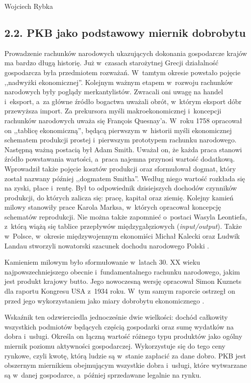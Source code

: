 \begin{artplenv}{Wojciech Rybka}
\subsection{2.2. PKB jako podstawowy miernik dobrobytu}
Prowadzenie rachunków narodowych ukazujących dokonania gospodarcze krajów ma bardzo długą historię. Już w~czasach
starożytnej Grecji działalność gospodarcza była przedmiotem rozważań. W~tamtym okresie powstało pojęcie ,,nadwyżki
ekonomicznej''. Kolejnym ważnym etapem w~rozwoju rachunków narodowych były poglądy merkantylistów. Zwracali oni uwagę na
handel i~eksport, a~za główne źródło bogactwa uważali obrót, w~którym eksport dóbr przewyższa import. Za prekursora
myśli makroekonomicznej i~koncepcji rachunków narodowych uważa się François Quesnay'a. W~roku 1758 opracował on
,,tablicę ekonomiczną'', będącą pierwszym w~historii myśli ekonomicznej schematem produkcji prostej i~pierwszym
prototypem rachunku narodowego. Następną ważną postacią był Adam Smith. Uważał on, że każda praca stanowi źródło
powstawania wartości, a~praca najemna przynosi wartość dodatkową. Wprowadził także pojęcie kosztów produkcji oraz
sformułował dogmat, który został nazwany później ,,dogmatem Smitha''. Według niego wartość rozkłada się na zyski, płace
i~rentę. Był to odpowiednik dzisiejszych dochodów czynników produkcji, do których zalicza się: pracę, kapitał oraz
ziemię. Kolejny kamień milowy stanowiły prace Karola Marksa, w~których opracował koncepcję schematów reprodukcji. Nie
można także zapomnieć o~postaci Wasyla Leontiefa, z~którą wiążą się tablice przepływów międzygałęziowych
(\textit{input/output}). Także w~Polsce, w~okresie międzywojennym ekonomiści Michał Kalecki oraz Ludwik Landau
stworzyli nowatorski szacunek dochodu narodowego Polski
\parencite{zienkowski_co_2001}.

Kamieniem milowym było sformułowanie w~latach 30. XX wieku najpowszechniejszego obecnie i~fundamentalnego rachunku
narodowego, jakim jest produkt krajowy butto. Jego nowoczesną wersję opracował Simon Kuznets dla raportu Kongresu
USA z~1934 roku. W~tym samym raporcie ostrzegł on przed jego wykorzystaniem jako miary dobrobytu ekonomicznego
\parencite{dickinson_gdp:_2011}.

Wskaźnik ten odzwierciedla jednocześnie dwie wielkości: dochód całkowity wszystkich podmiotów będących częścią
gospodarki oraz sumę wydatków na dobra i~usługi. Określa on łączną wartość różnego typu produktów jako ogólny miernik
poziomu aktywności gospodarczej. Wykorzystuje się do tego ceny rynkowe, czyli kwotę, którą ludzie są w~stanie zapłacić
za dane dobro. PKB jest obszernym miernikiem obejmującym wszystkie dobra i~usługi, które wytwarzane są w~danej
gospodarce, a~później sprzedawane legalnie na rynku.


\end{artplenv}
